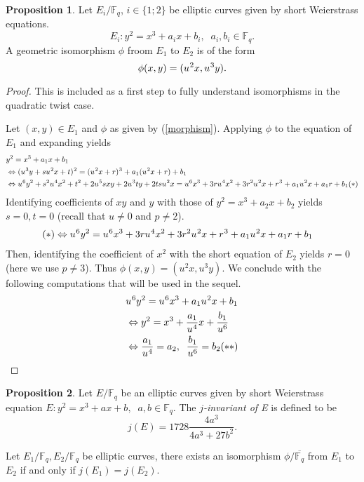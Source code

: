 \documentclass[10pt]{article}
\theoremstyle{definition}
\newtheorem{proposition}{Proposition}
\newcommand{\F}{\mathbb{F}}
\begin{document}
\begin{proposition}\label{prop:auto}
Let $E_i/\F_q$, $i \in \lbrace 1; 2 \rbrace$ be elliptic curves given by short Weierstrass equations.
\[ E_i : y^2 = x^3 + a_ix + b_i, \; \; a_i,b_i \in \F_q. \]
A geometric isomorphism $\phi$ froom $E_1$ to $E_2$ is of the form 
\[ \phi(x,y) = (u^{\mkern1mu 2}x, u^{\mkern1mu 3}y).\]  
\end{proposition}
\begin{proof}
This is included as a first step to fully understand isomorphisms in the quadratic twist case.

\noindent Let $(x,y) \in E_1$ and $\phi$ as given by (\ref{morphism}).
Applying $\phi$ to the equation of $E_1$ and expanding yields 
\begin{align*}
&y^2 = x^3 + a_1x + b_1\\
 & \Leftrightarrow ( u^{\mkern1mu 3}y + su^{\mkern1mu 2}x + t)^{\mkern1mu 2} =  (u^{\mkern1mu 2}x +r)^{\mkern1mu 3} +a_1(u^{\mkern1mu 2}x +r) +b_1 \\
& \Leftrightarrow  u^{\mkern1mu 6}y^2 + s^2u^{\mkern1mu 4}x^2 + t^2 + 2u^{\mkern1mu 5}sxy + 2u^{\mkern1mu 3}ty + 2tsu^{\mkern1mu 2}x  
=  u^{\mkern1mu 6}x^3 + 3ru^{\mkern1mu 4}x^2 + 3r^2 u^{\mkern1mu 2}x +r^{\mkern1mu 3} +a_1u^{\mkern1mu 2}x +a_1r +b_1 (*)\\
\end{align*} 
Identifying coefficients of $xy$ and $y$ with those of $y^2 = x^3 + a_2x + b_2$ yields $s=0, t= 0$ (recall that $u \neq 0$ and $ p \neq 2$).
\begin{align*}
(*) & \Leftrightarrow  u^{\mkern1mu 6}y^2   
=  u^{\mkern1mu 6}x^3 + 3ru^{\mkern1mu 4}x^2 + 3r^2 u^{\mkern1mu 2}x +r^{\mkern1mu 3} +a_1u^{\mkern1mu 2}x +a_1r +b_1 
\end{align*}
Then, identifying the coefficient of $x^2$ with the short equation of $E_2$ yields $r=0$ (here we use $p \neq 3$).
Thus $\phi(x,y) = (u^2x,u^3y)$.
We conclude with the following computations that will be used in the sequel.
\begin{align*}
 &u^{\mkern1mu 6}y^2   
=  u^{\mkern1mu 6}x^3 +a_1u^{\mkern1mu 2}x  +b_1 \\
& \Leftrightarrow  y^2   
=  x^3 +\frac{a_1}{u^{\mkern1mu 4}}x  + \frac{b_1}{u^6} \\
& \Leftrightarrow
\frac{a_1}{u^{\mkern1mu 4}} = a_2 , \; \;  \frac{b_1}{u^6}=b_2 (**)
\end{align*}
\end{proof}


\begin{proposition}
Let $E/\F_q$ be an elliptic curves given by short Weierstrass equation $ E : y^2 = x^3 + ax + b, \; \; a, b \in \F_q$.
The \textsl{$j$-invariant of E} is defined to be 
\[j(E) = 1728 \frac{4a^3}{4a^3+27b^2}.\]

\noindent Let $E_1/\F_q, E_2/\F_q$ be elliptic curves, there exists an isomorphism $\phi / \overline{\F_q}$ from $E_1$ to $E_2$ if and only if $j(E_1) = j(E_2)$. 
\end{proposition}
\end{document}
